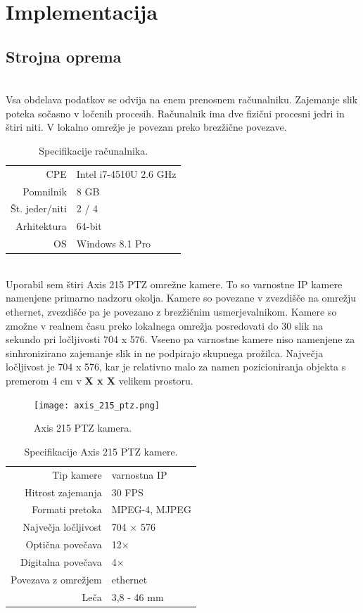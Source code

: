 \documentclass[a4paper, 12pt]{book}
\begin{document}
\chapter{Implementacija}

\section{Strojna oprema}

 \\
Vsa obdelava podatkov se odvija na enem prenosnem računalniku. Zajemanje slik poteka sočasno v ločenih procesih. Računalnik ima dve fizični procesni jedri in štiri niti. V lokalno omrežje je povezan preko brezžične povezave. 

\begin{table}[H]
\centering
\begin{tabular}{| r | l |}
\hline
CPE & Intel i7-4510U 2.6 GHz \\
Pomnilnik & 8 GB \\
Št. jeder/niti & 2 / 4 \\
Arhitektura & 64-bit \\
OS & Windows 8.1 Pro \\
\hline
\end{tabular}
\caption{Specifikacije računalnika.}
\end{table}

 \\
Uporabil sem štiri Axis 215 PTZ omrežne kamere. To so varnostne IP kamere namenjene primarno nadzoru okolja. Kamere so povezane v zvezdišče na omrežju ethernet, zvezdišče pa je povezano z brezžičnim usmerjevalnikom.  Kamere so zmožne v realnem času preko lokalnega omrežja posredovati do 30 slik na sekundo pri ločljivosti 704 x 576. Vseeno pa varnostne kamere niso namenjene za sinhronizirano zajemanje slik in ne podpirajo skupnega prožilca. Največja ločljivost je 704 x 576, kar je relativno malo za namen pozicioniranja objekta s premerom 4 cm v \textbf{X x X} velikem prostoru.
\begin{figure}[H]
\centering
\texttt{[image: axis\_215\_ptz.png]}
\caption{Axis 215 PTZ kamera.}
\end{figure}

\begin{table}[H]
\centering
\begin{tabular}{| r | l |}
\hline
Tip kamere & varnostna IP \\
Hitrost zajemanja & 30 FPS \\
Formati pretoka & MPEG-4, MJPEG \\
Največja ločljivost & 704 $\times$ 576 \\
Optična povečava & 12$\times$ \\
Digitalna povečava & 4$\times$ \\
Povezava z omrežjem & ethernet \\
Leča & 3,8 - 46 mm \\
\hline
\end{tabular}
\caption{Specifikacije Axis 215 PTZ kamere.}
\end{table}
\end{document}
